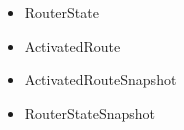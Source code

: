


\begin{itemize}
  \item RouterState
  \item ActivatedRoute
  \item ActivatedRouteSnapshot
  \item RouterStateSnapshot
\end{itemize}













